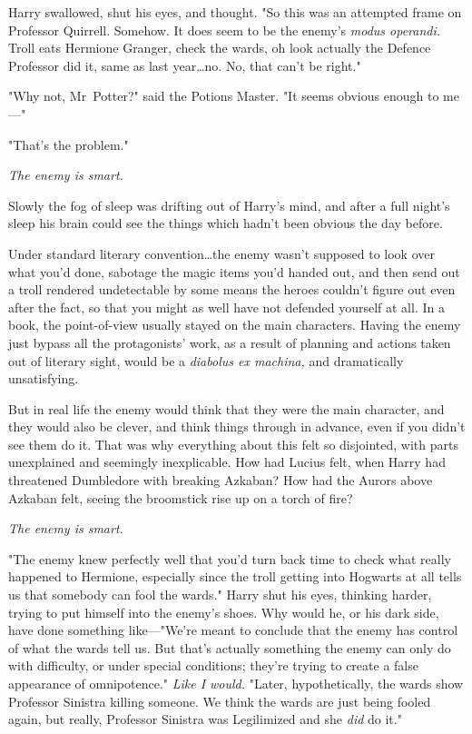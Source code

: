 Harry swallowed, shut his eyes, and thought. "So this was an attempted frame on
Professor Quirrell. Somehow. It does seem to be the enemy's \emph{modus
operandi.} Troll eats Hermione Granger, check the wards, oh look actually the
Defence Professor did it, same as last year…no. No, that can't be
right."

"Why not, Mr~Potter?" said the Potions Master. "It seems obvious enough to
me—"

"That's the problem."

\emph{The enemy is smart.}

Slowly the fog of sleep was drifting out of Harry's mind, and after a full
night's sleep his brain could see the things which hadn't been obvious the day
before.

Under standard literary convention…the enemy wasn't supposed to look
over what you'd done, sabotage the magic items you'd handed out, and then send
out a troll rendered undetectable by some means the heroes couldn't figure out
even after the fact, so that you might as well have not defended yourself at
all. In a book, the point-of-view usually stayed on the main characters. Having
the enemy just bypass all the protagonists' work, as a result of planning and
actions taken out of literary sight, would be a \emph{diabolus ex machina,} and
dramatically unsatisfying.

But in real life the enemy would think that they were the main character, and
they would also be clever, and think things through in advance, even if you
didn't see them do it. That was why everything about this felt so disjointed,
with parts unexplained and seemingly inexplicable. How had Lucius felt, when
Harry had threatened Dumbledore with breaking Azkaban? How had the Aurors above
Azkaban felt, seeing the broomstick rise up on a torch of fire?

\emph{The enemy is smart.}

"The enemy knew perfectly well that you'd turn back time to check what really
happened to Hermione, especially since the troll getting into Hogwarts at all
tells us that somebody can fool the wards." Harry shut his eyes, thinking
harder, trying to put himself into the enemy's shoes. Why would he, or his dark
side, have done something like—"We're meant to conclude that the enemy has
control of what the wards tell us. But that's actually something the enemy can
only do with difficulty, or under special conditions; they're trying to create
a false appearance of omnipotence." \emph{Like I would.} "Later,
hypothetically, the wards show Professor Sinistra killing someone. We think the
wards are just being fooled again, but really, Professor Sinistra was
Legilimized and she \emph{did} do it."

